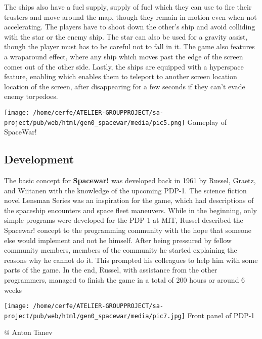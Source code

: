 \documentclass[a4paper,10pt]{book}
\begin{document}
 
 
        The ships also have a fuel supply, supply of fuel  which they can use to fire their trusters and move around the map, though they remain
        in motion even when not accelerating. The players have to shoot down the other's ship and avoid colliding with the star or
        the enemy ship. The star can also be used for a gravity assist, though the player must  has to  be careful not to fall in it. The game
        also features a wraparound effect, where any ship which moves past the edge of the screen comes out of the other side. Lastly,
        the ships are equipped with a hyperspace feature, enabling  which enables  them to teleport to another screen location  location of the screen,  after
        disappearing for a few seconds if they can't evade enemy torpedoes.
         
 
 
 \texttt{[image: /home/cerfe/ATELIER-GROUPPROJECT/sa-project/pub/web/html/gen0\_spacewar/media/pic5.png]}
 Gameplay of SpaceWar! 
 
 
 \subsection{Development }
 
        The basic concept for  \textbf{Spacewar! }  was developed back in 1961 by Russel, Graetz, and Wiitanen with the knowledge of the upcoming PDP-1.
        The science fiction novel Lensman Series was an inspiration for the game, which had descriptions of the spaceship encounters and
        space fleet maneuvers. While in the beginning, only simple programs were developed for the PDP-1 at MIT, Russel described the
        Spacewar! concept to the programming community with the hope that someone else would implement and not he himself. After being
        pressured by fellow community members,  members of the community  he started explaining  the reasons  why he cannot do it. This prompted his colleagues
        to help him with some parts of the game. In the end, Russel, with assistance from the other programmers, managed to finish the game
        in a total of 200 hours or around 6 weeks
         
 
 
 \texttt{[image: /home/cerfe/ATELIER-GROUPPROJECT/sa-project/pub/web/html/gen0\_spacewar/media/pic7.jpg]}
 Front panel of PDP-1 
 
 
 
 @ Anton Tanev 
 
\end{document}
